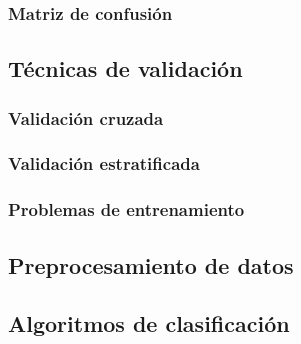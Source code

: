 \subsubsection{Matriz de confusión}
\label{subsubsec:matrix}



\subsection{Técnicas de validación}
\label{subsec:validacion}



\subsubsection{Validación cruzada}
\label{subsubsec:cv}



\subsubsection{Validación estratificada}
\label{subsubsec:ev}



\subsubsection{Problemas de entrenamiento}
\label{subsubsec:overunderfit}

\subsection{Preprocesamiento de datos}
\label{subsec:}



\subsubsection{}
\label{subsubsec:}




\subsection{Algoritmos de clasificación}
\label{subsec:}



\subsubsection{}
\label{subsubsec:}



